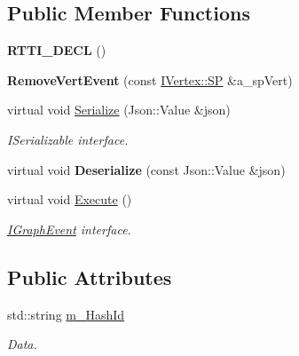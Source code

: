 \subsection*{Public Member Functions}
\begin{DoxyCompactItemize}
\item 
\mbox{\label{struct_graph_connector_1_1_remove_vert_event_a6795fe5a3c663863260af178ba47a873}} 
{\bfseries R\+T\+T\+I\+\_\+\+D\+E\+CL} ()
\item 
\mbox{\label{struct_graph_connector_1_1_remove_vert_event_a73401c3b0aaf3961aebd4a17686c20da}} 
{\bfseries Remove\+Vert\+Event} (const \hyperlink{class_i_graph_1_1_i_vertex_af72b9df91f110bc7824c608c10cc819c}{I\+Vertex\+::\+SP} \&a\+\_\+sp\+Vert)
\item 
\mbox{\label{struct_graph_connector_1_1_remove_vert_event_af07b5b6dcf61adc0cc6a8810b7acfdd7}} 
virtual void \hyperlink{struct_graph_connector_1_1_remove_vert_event_af07b5b6dcf61adc0cc6a8810b7acfdd7}{Serialize} (Json\+::\+Value \&json)
\begin{DoxyCompactList}\small\item\em I\+Serializable interface. \end{DoxyCompactList}\item 
\mbox{\label{struct_graph_connector_1_1_remove_vert_event_abf2d7c43c22750f75eba996540a483de}} 
virtual void {\bfseries Deserialize} (const Json\+::\+Value \&json)
\item 
\mbox{\label{struct_graph_connector_1_1_remove_vert_event_a1b08072a25a554589c09d1b4527b7440}} 
virtual void \hyperlink{struct_graph_connector_1_1_remove_vert_event_a1b08072a25a554589c09d1b4527b7440}{Execute} ()
\begin{DoxyCompactList}\small\item\em \hyperlink{struct_graph_connector_1_1_i_graph_event}{I\+Graph\+Event} interface. \end{DoxyCompactList}\end{DoxyCompactItemize}
\subsection*{Public Attributes}
\begin{DoxyCompactItemize}
\item 
\mbox{\label{struct_graph_connector_1_1_remove_vert_event_abf8a89a0e279870752380117f23d5c92}} 
std\+::string \hyperlink{struct_graph_connector_1_1_remove_vert_event_abf8a89a0e279870752380117f23d5c92}{m\+\_\+\+Hash\+Id}
\begin{DoxyCompactList}\small\item\em Data. \end{DoxyCompactList}\end{DoxyCompactItemize}
